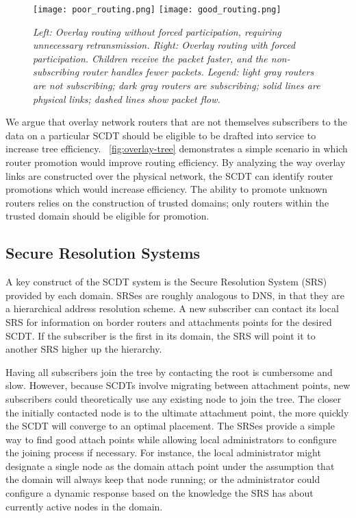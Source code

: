 \begin{figure}[t]
	\begin{center}
		\texttt{[image: poor\_routing.png]}
		\texttt{[image: good\_routing.png]}
	\end{center}
	\vspace{-1.3em}
	\caption{\small \itshape Left: Overlay routing without forced participation, requiring unnecessary retransmission.  Right: Overlay routing with forced participation.  Children receive the packet faster, and the non-subscribing router handles fewer packets.  Legend: light gray routers are not subscribing; dark gray routers are subscribing; solid lines are physical links; dashed lines show packet flow.}
	\vspace{-1em}
	\label{fig:overlay-tree}
\end{figure}

We argue that overlay network routers that are not themselves subscribers to the
data on a particular SCDT should be eligible to be drafted into service to
increase tree efficiency. ~\autoref{fig:overlay-tree} demonstrates a simple 
scenario in which
router promotion would improve routing efficiency.  By analyzing the way overlay
links are constructed over the physical network, the SCDT can identify router
promotions which would increase efficiency.  The ability to promote unknown
routers relies on the construction of trusted domains; only routers within the
trusted domain should be eligible for promotion.

\subsection{Secure Resolution Systems}
\label{sec-resolution-system}

A key construct of the SCDT system is the Secure Resolution System (SRS)
provided by each domain.  SRSes are roughly analogous to DNS, in that they are a
hierarchical address resolution scheme.  A new subscriber can contact its local
SRS for information on border routers and attachments points for the desired
SCDT.  If the subscriber is the first in its domain, the SRS will point it to
another SRS higher up the hierarchy.

Having all subscribers join the tree by contacting the root is cumbersome and slow. However, because SCDTs involve migrating between attachment points, new subscribers could theoretically use any existing node to join the tree. The closer the initially contacted node is to the ultimate attachment point, the more quickly the SCDT will converge to an optimal placement. The SRSes provide a simple way to find good attach points while allowing local administrators to configure the joining process if necessary. For instance, the local administrator might designate a single node as the domain attach point under the assumption that the domain will always keep that node running; or the administrator could configure a dynamic response based on the knowledge the SRS has about currently active nodes in the domain.

